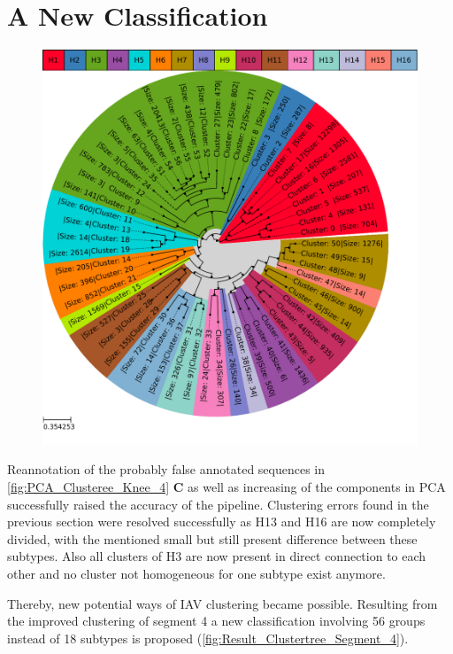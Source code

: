 \section{A New Classification} \label{sec:Serotype_Classification}

\begin{figure}[!hbt]
    \centering
    \includegraphics[width=\textwidth]{Results/Clustertree_Segment_4.pdf}
    \caption[]{}
    \label{fig:Result_Clustertree_Segment_4}
\end{figure}

Reannotation of the probably false annotated sequences in \autoref{fig:PCA_Clusteree_Knee_4} \textbf{\textsf{C}} as well as increasing of the components in \gls{PCA} successfully raised the accuracy of the pipeline. Clustering errors found in the previous section were resolved successfully as H13 and H16 are now completely divided, with the mentioned small but still present difference between these subtypes. Also all clusters of H3 are now present in direct connection to each other and no cluster not homogeneous for one subtype exist anymore. 

Thereby, new potential ways of \gls{IAV} clustering became possible. Resulting from the improved clustering of segment 4 a new classification involving 56 groups instead of 18 subtypes is proposed (\autoref{fig:Result_Clustertree_Segment_4}).

